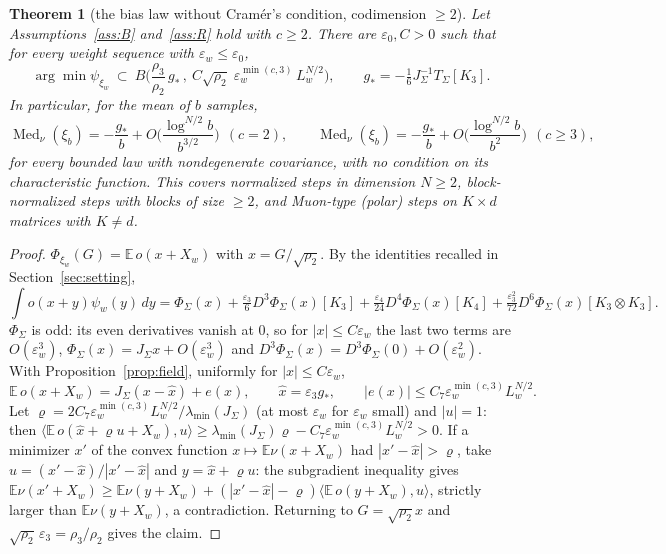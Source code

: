 \documentclass[10pt]{article}
\newtheorem{theorem}{Theorem}
\theoremstyle{definition}
\theoremstyle{remark}
\newcommand{\E}{\mathbb{E}}
\newcommand{\inner}[2]{\langle #1, #2\rangle}
\newcommand{\Med}{\operatorname{Med}}
\newcommand{\ew}{\varepsilon_w}
\newcommand{\Lw}{L_w}
\begin{document}
\begin{theorem}[the bias law without Cram\'er's condition, codimension $\ge2$]\label{thm:codim}
Let Assumptions~\ref{ass:B} and~\ref{ass:R} hold with $c\ge2$. There are $\varepsilon_0,C>0$ such that for every weight
sequence with $\ew\le\varepsilon_0$,
\[
\arg\min\psi_{\xi_w}\ \subset\ B\Big(\frac{\rho_3}{\rho_2}\,g_\ast\,,\ C\sqrt{\rho_2}\;\ew^{\min(c,3)}\,\Lw^{N/2}\Big),
\qquad g_\ast=-\tfrac16J_\Sigma^{-1}T_\Sigma[K_3].
\]
In particular, for the mean of $b$ samples,
\[
\Med_\nu(\xi_b)=-\frac{g_\ast}{b}+O\Big(\frac{\log^{N/2}b}{b^{3/2}}\Big)\ \ (c=2),\qquad
\Med_\nu(\xi_b)=-\frac{g_\ast}{b}+O\Big(\frac{\log^{N/2}b}{b^{2}}\Big)\ \ (c\ge3),
\]
for every bounded law with nondegenerate covariance, with no condition on its characteristic function. This covers
normalized steps in dimension $N\ge2$, block-normalized steps with blocks of size $\ge2$, and Muon-type (polar) steps
on $K\times d$ matrices with $K\ne d$.
\end{theorem}
\begin{proof}
$\Phi_{\xi_w}(G)=\E\,o(x+X_w)$ with $x=G/\sqrt{\rho_2}$. By the identities recalled in Section~\ref{sec:setting},
\[
\int o(x+y)\psi_w(y)\,dy=\Phi_\Sigma(x)+\tfrac{\varepsilon_3}6D^3\Phi_\Sigma(x)[K_3]+\tfrac{\varepsilon_4}{24}D^4\Phi_\Sigma(x)[K_4]
+\tfrac{\varepsilon_3^2}{72}D^6\Phi_\Sigma(x)[K_3\otimes K_3].
\]
$\Phi_\Sigma$ is odd: its even derivatives vanish at $0$, so for $|x|\le C\ew$ the last two terms are $O(\ew^3)$,
$\Phi_\Sigma(x)=J_\Sigma x+O(\ew^3)$ and $D^3\Phi_\Sigma(x)=D^3\Phi_\Sigma(0)+O(\ew^2)$. With
Proposition~\ref{prop:field}, uniformly for $|x|\le C\ew$,
\[
\E\,o(x+X_w)=J_\Sigma(x-\hat x)+e(x),\qquad \hat x=\varepsilon_3g_\ast,\qquad|e(x)|\le C_7\ew^{\min(c,3)}\Lw^{N/2}.
\]
Let $\varrho=2C_7\ew^{\min(c,3)}\Lw^{N/2}/\lambda_{\min}(J_\Sigma)$ (at most $\ew$ for $\ew$ small) and $|u|=1$: then
$\inner{\E\,o(\hat x+\varrho u+X_w)}{u}\ge\lambda_{\min}(J_\Sigma)\varrho-C_7\ew^{\min(c,3)}\Lw^{N/2}>0$. If a minimizer $x'$
of the convex function $x\mapsto\E\nu(x+X_w)$ had $|x'-\hat x|>\varrho$, take $u=(x'-\hat x)/|x'-\hat x|$ and
$y=\hat x+\varrho u$: the subgradient inequality gives $\E\nu(x'+X_w)\ge\E\nu(y+X_w)+(|x'-\hat x|-\varrho)\inner{\E\,o(y+X_w)}u$,
strictly larger than $\E\nu(y+X_w)$, a contradiction. Returning to $G=\sqrt{\rho_2}x$ and
$\sqrt{\rho_2}\,\varepsilon_3=\rho_3/\rho_2$ gives the claim.
\end{proof}
\end{document}
